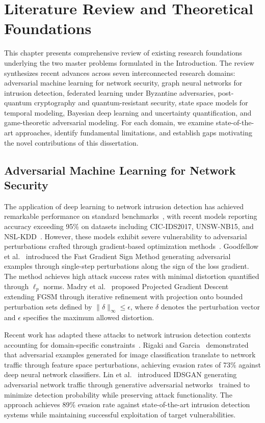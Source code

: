 \chapter{Literature Review and Theoretical Foundations}
\label{ch:literature}

This chapter presents comprehensive review of existing research foundations underlying the two master problems formulated in the Introduction. The review synthesizes recent advances across seven interconnected research domains: adversarial machine learning for network security, graph neural networks for intrusion detection, federated learning under Byzantine adversaries, post-quantum cryptography and quantum-resistant security, state space models for temporal modeling, Bayesian deep learning and uncertainty quantification, and game-theoretic adversarial modeling. For each domain, we examine state-of-the-art approaches, identify fundamental limitations, and establish gaps motivating the novel contributions of this dissertation.

\section{Adversarial Machine Learning for Network Security}
\label{sec:lit_adversarial}

The application of deep learning to network intrusion detection has achieved remarkable performance on standard benchmarks~\cite{buczak2016survey,vinayakumar2017applying}, with recent models reporting accuracy exceeding 95\% on datasets including CIC-IDS2017, UNSW-NB15, and NSL-KDD~\cite{sharafaldin2018cicids,moustafa2015unsw}. However, these models exhibit severe vulnerability to adversarial perturbations crafted through gradient-based optimization methods~\cite{biggio2013evasion,szegedy2014intriguing}. Goodfellow et al.~\cite{goodfellow2015explaining} introduced the Fast Gradient Sign Method generating adversarial examples through single-step perturbations along the sign of the loss gradient. The method achieves high attack success rates with minimal distortion quantified through $\ell_p$ norms. Madry et al.~\cite{madry2018towards} proposed Projected Gradient Descent extending FGSM through iterative refinement with projection onto bounded perturbation sets defined by $\|\delta\|_\infty \leq \epsilon$, where $\delta$ denotes the perturbation vector and $\epsilon$ specifies the maximum allowed distortion.

Recent work has adapted these attacks to network intrusion detection contexts accounting for domain-specific constraints~\cite{corona2019adversarial}. Rigaki and Garcia~\cite{rigaki2018adversarial} demonstrated that adversarial examples generated for image classification translate to network traffic through feature space perturbations, achieving evasion rates of 73\% against deep neural network classifiers. Lin et al.~\cite{lin2018idsgan} introduced IDSGAN generating adversarial network traffic through generative adversarial networks~\cite{goodfellow2014generative} trained to minimize detection probability while preserving attack functionality. The approach achieves 89\% evasion rate against state-of-the-art intrusion detection systems while maintaining successful exploitation of target vulnerabilities.

